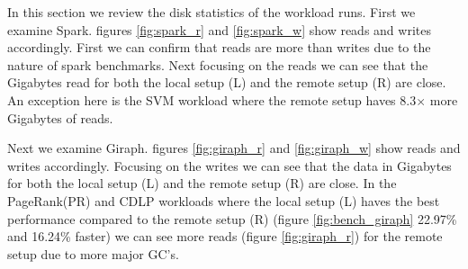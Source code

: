 In this section we review the disk statistics of the workload runs. First we
 examine Spark. figures \ref{fig:spark_r} and \ref{fig:spark_w} show reads and
 writes accordingly. First we can confirm that reads are more than writes due to
 the nature of spark benchmarks. Next focusing on the reads we can see that the
 Gigabytes read for both the local setup (L) and the remote setup (R) are close.
 An exception here is the SVM workload where the remote setup haves 8.3$\times$
 more Gigabytes of reads.
 
 Next we examine Giraph. figures \ref{fig:giraph_r} and \ref{fig:giraph_w} show
 reads and writes accordingly. Focusing on the writes we can see that the data
 in Gigabytes for both the local setup (L) and the remote setup (R) are close.
 In the PageRank(PR)	and CDLP workloads where the local setup (L) haves the
 best performance compared to the remote setup (R) (figure
 \ref{fig:bench_giraph} 22.97\% and 16.24\% faster) we can see more reads
 (figure \ref{fig:giraph_r}) for the remote setup due to more major GC's.

